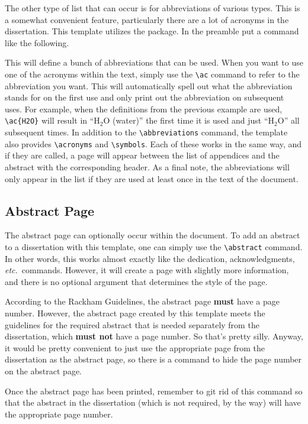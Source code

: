 \documentclass[thesis]{../cls/thesis-umich}
\begin{document}
The other type of list that can occur is for abbreviations of various
types.  This is a somewhat convenient feature, particularly there are a
lot of acronyms in the dissertation.  This template utilizes the
 package.  In the preamble put a command like the
following.
\begin{code}
\end{code}
This will define a bunch of abbreviations that can be used.  When you
want to use one of the acronyms within the text, simply use the
\verb|\ac| command to refer to the abbreviation you want.  This will
automatically spell out what the abbreviation stands for on the first
use and only print out the abbreviation on subsequent uses.  For
example, when the definitions from the previous example are used,
\verb|\ac{H2O}| will result in ``$\mathrm{H_2O}$ (water)'' the first
time it is used and just ``$\mathrm{H_2O}$'' all subsequent times.  In
addition to the \verb|\abbreviations| command, the template also
provides \verb|\acronyms| and \verb|\symbols|.  Each of these works in
the same way, and if they are called, a page will appear between the
list of appendices and the abstract with the corresponding header.  As a
final note, the abbreviations will only appear in the list if they are
used at least once in the text of the document.

\subsection{Abstract Page}
The abstract page can optionally occur within the document.  To add an
abstract to a dissertation with this template, one can simply use the
\verb|\abstract| command.  In other words, this works almost exactly
like the dedication, acknowledgments, \textit{etc.}~commands.  However,
it will create a page with slightly more information, and there is no
optional argument that determines the style of the page.

According to the Rackham Guidelines, the abstract page
\textsf{\textbf{must}} have a page number.  However, the abstract page
created by this template meets the guidelines for the required abstract
that is needed separately from the dissertation, which
\textsf{\textbf{must not}} have a page number.  So that's pretty silly.
Anyway, it would be pretty convenient to just use the appropriate page
from the dissertation as the abstract page, so there is a command to
hide the page number on the abstract page.
\begin{code}
\hideabstractpagenumber
\end{code}
Once the abstract page has been printed, remember to git rid of this
command so that the abstract in the dissertation (which is not required,
by the way) will have the appropriate page number.
\end{document}
